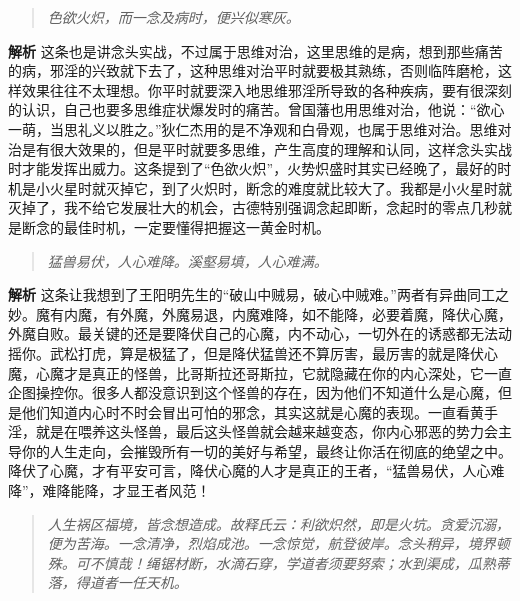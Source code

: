 \begin{quote}\it
    色欲火炽，而一念及病时，便兴似寒灰。
\end{quote}

\textbf{解析} 这条也是讲念头实战，不过属于思维对治，这里思维的是病，想到那些痛苦的病，邪淫的兴致就下去了，这种思维对治平时就要极其熟练，否则临阵磨枪，这样效果往往不太理想。你平时就要深入地思维邪淫所导致的各种疾病，要有很深刻的认识，自己也要多思维症状爆发时的痛苦。曾国藩也用思维对治，他说：“欲心一萌，当思礼义以胜之。”狄仁杰用的是不净观和白骨观，也属于思维对治。思维对治是有很大效果的，但是平时就要多思维，产生高度的理解和认同，这样念头实战时才能发挥出威力。这条提到了“色欲火炽”，火势炽盛时其实已经晚了，最好的时机是小火星时就灭掉它，到了火炽时，断念的难度就比较大了。我都是小火星时就灭掉了，我不给它发展壮大的机会，古德特别强调念起即断，念起时的零点几秒就是断念的最佳时机，一定要懂得把握这一黄金时机。

\begin{quote}\it
    猛兽易伏，人心难降。溪壑易填，人心难满。
\end{quote}

\textbf{解析} 这条让我想到了王阳明先生的“破山中贼易，破心中贼难。”两者有异曲同工之妙。魔有内魔，有外魔，外魔易退，内魔难降，如不能降，必要着魔，降伏心魔，外魔自败。最关键的还是要降伏自己的心魔，内不动心，一切外在的诱惑都无法动摇你。武松打虎，算是极猛了，但是降伏猛兽还不算厉害，最厉害的就是降伏心魔，心魔才是真正的怪兽，比哥斯拉还哥斯拉，它就隐藏在你的内心深处，它一直企图操控你。很多人都没意识到这个怪兽的存在，因为他们不知道什么是心魔，但是他们知道内心时不时会冒出可怕的邪念，其实这就是心魔的表现。一直看黄手淫，就是在喂养这头怪兽，最后这头怪兽就会越来越变态，你内心邪恶的势力会主导你的人生走向，会摧毁所有一切的美好与希望，最终让你活在彻底的绝望之中。降伏了心魔，才有平安可言，降伏心魔的人才是真正的王者，“猛兽易伏，人心难降”，难降能降，才显王者风范！

\begin{quote}\it
    人生祸区福境，皆念想造成。故释氏云：利欲炽然，即是火坑。贪爱沉溺，便为苦海。一念清净，烈焰成池。一念惊觉，航登彼岸。念头稍异，境界顿殊。可不慎哉！绳锯材断，水滴石穿，学道者须要努索；水到渠成，瓜熟蒂落，得道者一任天机。
\end{quote}

